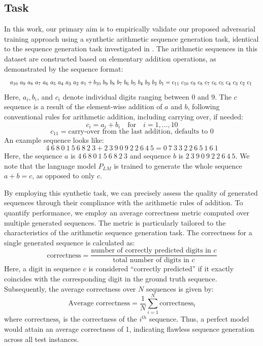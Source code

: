 \documentclass[11pt]{article}
\begin{document}
\subsection{Task}
\label{sec:task}
In this work, our primary aim is to empirically validate our proposed adversarial training approach using a synthetic arithmetic sequence generation task, identical to the sequence generation task investigated in \cite{ResidualEBM2023}. The arithmetic sequences in this dataset are constructed based on elementary addition operations, as demonstrated by the sequence format:
\[  \resizebox{\linewidth}{!}{%
\(a_{10}\ a_9\ a_8\ a_7\ a_6\ a_5\ a_4\ a_3\ a_2\ a_1 + b_{10}\ b_9\ b_8\ b_7\ b_6\ b_5\ b_4\ b_3\ b_2\ b_1 = c_{11}\ c_{10}\ c_9\ c_8\ c_7\ c_6\ c_5\ c_4\ c_3\ c_2\ c_1\)
}
\]
Here, \(a_i, b_i\), and \(c_i\) denote individual digits ranging between 0 and 9. 
The \(c\) sequence is a result of the element-wise addition of \(a\) and \(b\), following conventional rules for arithmetic addition, including carrying over, if needed:
\[
c_i = a_i + b_i \quad \text{for} \quad i=1,\ldots, 10
\]
\[
c_{11} = \text{carry-over from the last addition, defaults to 0}
\]
An example sequence looks like:
\[
4\ 6\ 8\ 0\ 1\ 5\ 6\ 8\ 2\ 3 + 2\ 3\ 9\ 0\ 9\ 2\ 2\ 6\ 4\ 5 = 0\ 7\ 3\ 3\ 2\ 2\ 6\ 5\ 1\ 6\ 1
\]
Here, the sequence \(a\) is \(4\ 6\ 8\ 0\ 1\ 5\ 6\ 8\ 2\ 3\) and sequence \(b\) is \(2\ 3\ 9\ 0\ 9\ 2\ 2\ 6\ 4\ 5\). We note that the language model \(P_{LM}\) is trained to generate the whole sequence \(a+b=c\), as opposed to only \(c\).

By employing this synthetic task, we can precisely assess the quality of generated sequences through their compliance with the arithmetic rules of addition.
To quantify performance, we employ an average correctness metric computed over multiple generated sequences. The metric is particularly tailored to the characteristics of the arithmetic sequence generation task. The correctness for a single generated sequence is calculated as:
\[
\text{correctness} = \frac{\text{number of correctly predicted digits in } c}{\text{total number of digits in } c}
\]
Here, a digit in sequence \( c \) is considered ``correctly predicted'' if it exactly coincides with the corresponding digit in the ground truth sequence.
Subsequently, the average correctness over \( N \) sequences is given by:
\[
\text{Average correctness} = \frac{1}{N} \sum_{i=1}^{N} \text{correctness}_i
\]
where \( \text{correctness}_i \) is the correctness of the \( i^{th} \) sequence. Thus, a perfect model would attain an average correctness of 1, indicating flawless sequence generation across all test instances.
\end{document}
